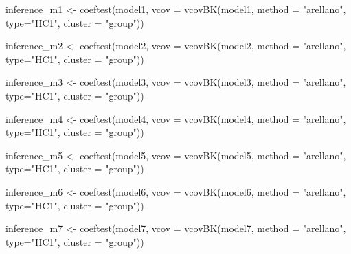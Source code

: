 \documentclass[a4paper,nobind]{templates/ociamthesis}
\newenvironment{Shaded}{\begin{snugshade}}{\end{snugshade}}
\newcommand{\AttributeTok}[1]{\textcolor[rgb]{0.77,0.63,0.00}{#1}}
\newcommand{\FunctionTok}[1]{\textcolor[rgb]{0.00,0.00,0.00}{#1}}
\newcommand{\NormalTok}[1]{#1}
\newcommand{\OtherTok}[1]{\textcolor[rgb]{0.56,0.35,0.01}{#1}}
\newcommand{\StringTok}[1]{\textcolor[rgb]{0.31,0.60,0.02}{#1}}
\renewenvironment{Shaded}
{
  \vspace{10pt}%
  \begin{snugshade}%
}{%
  \end{snugshade}%
  \vspace{8pt}%
}
\begin{document}
\begin{Shaded}
\begin{Highlighting}[]
\NormalTok{inference\_m1 }\OtherTok{\textless{}{-}} \FunctionTok{coeftest}\NormalTok{(model1, }\AttributeTok{vcov =} \FunctionTok{vcovBK}\NormalTok{(model1, }\AttributeTok{method =} \StringTok{"arellano"}\NormalTok{, }\AttributeTok{type=}\StringTok{"HC1"}\NormalTok{, }\AttributeTok{cluster =} \StringTok{"group"}\NormalTok{))}

\NormalTok{inference\_m2 }\OtherTok{\textless{}{-}} \FunctionTok{coeftest}\NormalTok{(model2, }\AttributeTok{vcov =} \FunctionTok{vcovBK}\NormalTok{(model2, }\AttributeTok{method =} \StringTok{"arellano"}\NormalTok{, }\AttributeTok{type=}\StringTok{"HC1"}\NormalTok{, }\AttributeTok{cluster =} \StringTok{"group"}\NormalTok{))}

\NormalTok{inference\_m3 }\OtherTok{\textless{}{-}} \FunctionTok{coeftest}\NormalTok{(model3, }\AttributeTok{vcov =} \FunctionTok{vcovBK}\NormalTok{(model3, }\AttributeTok{method =} \StringTok{"arellano"}\NormalTok{, }\AttributeTok{type=}\StringTok{"HC1"}\NormalTok{, }\AttributeTok{cluster =} \StringTok{"group"}\NormalTok{))}

\NormalTok{inference\_m4 }\OtherTok{\textless{}{-}} \FunctionTok{coeftest}\NormalTok{(model4, }\AttributeTok{vcov =} \FunctionTok{vcovBK}\NormalTok{(model4, }\AttributeTok{method =} \StringTok{"arellano"}\NormalTok{, }\AttributeTok{type=}\StringTok{"HC1"}\NormalTok{, }\AttributeTok{cluster =} \StringTok{"group"}\NormalTok{))}

\NormalTok{inference\_m5 }\OtherTok{\textless{}{-}} \FunctionTok{coeftest}\NormalTok{(model5, }\AttributeTok{vcov =} \FunctionTok{vcovBK}\NormalTok{(model5, }\AttributeTok{method =} \StringTok{"arellano"}\NormalTok{, }\AttributeTok{type=}\StringTok{"HC1"}\NormalTok{, }\AttributeTok{cluster =} \StringTok{"group"}\NormalTok{))}

\NormalTok{inference\_m6 }\OtherTok{\textless{}{-}} \FunctionTok{coeftest}\NormalTok{(model6, }\AttributeTok{vcov =} \FunctionTok{vcovBK}\NormalTok{(model6, }\AttributeTok{method =} \StringTok{"arellano"}\NormalTok{, }\AttributeTok{type=}\StringTok{"HC1"}\NormalTok{, }\AttributeTok{cluster =} \StringTok{"group"}\NormalTok{))}

\NormalTok{inference\_m7 }\OtherTok{\textless{}{-}} \FunctionTok{coeftest}\NormalTok{(model7, }\AttributeTok{vcov =} \FunctionTok{vcovBK}\NormalTok{(model7, }\AttributeTok{method =} \StringTok{"arellano"}\NormalTok{, }\AttributeTok{type=}\StringTok{"HC1"}\NormalTok{, }\AttributeTok{cluster =} \StringTok{"group"}\NormalTok{))}


\end{Highlighting}
\end{Shaded}
\end{document}
